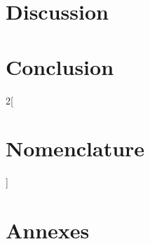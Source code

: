 \documentclass[11pt]{report}
\begin{document}
\chapter{Discussion}


\chapter{Conclusion}


\begin{multicols}{2}[\chapter{Nomenclature}]

\end{multicols}

 


\chapter{Annexes}

\end{document}
